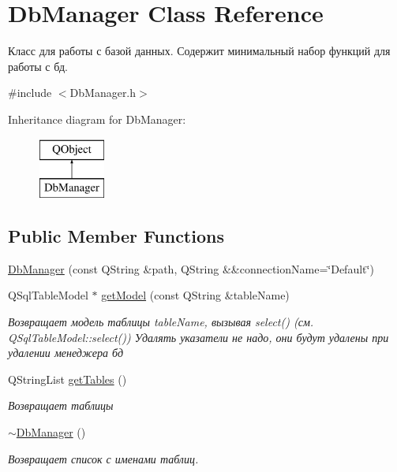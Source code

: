 \hypertarget{class_db_manager}{}\section{Db\+Manager Class Reference}
\label{class_db_manager}


Класс для работы с базой данных. Содержит минимальный набор функций для работы с бд.  




{\ttfamily \#include $<$Db\+Manager.\+h$>$}

Inheritance diagram for Db\+Manager\+:\begin{figure}[H]
\begin{center}
\leavevmode
\includegraphics[height=2.000000cm]{class_db_manager}
\end{center}
\end{figure}
\subsection*{Public Member Functions}
\begin{DoxyCompactItemize}
\item 
\mbox{\hyperlink{class_db_manager_acae386f0fc2af5d3f3b5c2adc5226391}{Db\+Manager}} (const Q\+String \&path, Q\+String \&\&connection\+Name=\char`\"{}Default\char`\"{})
\item 
Q\+Sql\+Table\+Model $\ast$ \mbox{\hyperlink{class_db_manager_a4b9a7828f0d6e53b695da5168570653c}{get\+Model}} (const Q\+String \&table\+Name)
\begin{DoxyCompactList}\small\item\em Возвращает модель таблицы table\+Name, вызывая select() (см. Q\+Sql\+Table\+Model\+::select()) Удалять указатели не надо, они будут удалены при удалении менеджера бд \end{DoxyCompactList}\item 
Q\+String\+List \mbox{\hyperlink{class_db_manager_a56efe9d49dc68dcdef05ae834f7618b0}{get\+Tables}} ()
\begin{DoxyCompactList}\small\item\em Возвращает таблицы \end{DoxyCompactList}\item 
\mbox{\label{class_db_manager_ac5cdf8e5e932d1681ab807d8f256374c}} 
\mbox{\hyperlink{class_db_manager_ac5cdf8e5e932d1681ab807d8f256374c}{$\sim$\+Db\+Manager}} ()
\begin{DoxyCompactList}\small\item\em Возвращает список с именами таблиц. \end{DoxyCompactList}\end{DoxyCompactItemize}

